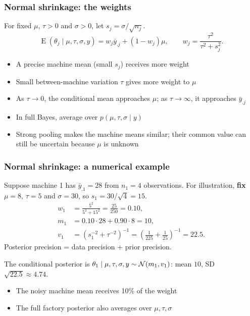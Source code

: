 \documentclass[10pt]{beamer}
\begin{document}
\begin{frame}
\frametitle{Normal shrinkage: the weights}

  For fixed $\mu$, $\tau>0$ and $\sigma>0$, let $s_j=\sigma/\sqrt{n_j}$.
  \[
    \operatorname{E}(\theta_j\mid\mu,\tau,\sigma,y)
      =w_j\bar y_{.j}+(1-w_j)\mu,\qquad
    w_j=\frac{\tau^2}{\tau^2+s_j^2}.
  \]
  \begin{itemize}
  \item A precise machine mean (small $s_j$) receives more weight
  \item Small between-machine variation $\tau$ gives more weight to $\mu$
  \item As $\tau\to0$, the conditional mean approaches $\mu$;
    as $\tau\to\infty$, it approaches $\bar y_{.j}$
  \item In full Bayes, average over $p(\mu,\tau,\sigma\mid y)$
  \item Strong pooling makes the machine means similar;
    their common value can still be uncertain because $\mu$ is unknown
  \end{itemize}
\end{frame}

\begin{frame}
\frametitle{Normal shrinkage: a numerical example}

  Suppose machine 1 has $\bar y_{.1}=28$ from $n_1=4$ observations.
  For illustration, \textbf{fix} $\mu=8$, $\tau=5$ and $\sigma=30$,
  so $s_1=30/\sqrt{4}=15$.
  \begin{align*}
    w_1&=\frac{5^2}{5^2+15^2}=\frac{25}{250}=0.10,\\
    m_1&=0.10\cdot28+0.90\cdot8=10,\\
    v_1&=\left(s_1^{-2}+\tau^{-2}\right)^{-1}
      =\left(\frac{1}{225}+\frac{1}{25}\right)^{-1}=22.5.
  \end{align*}
  Posterior precision = data precision + prior precision.

  The conditional posterior is
  $\theta_1\mid\mu,\tau,\sigma,y\sim\mathcal{N}(m_1,v_1)$:
  mean $10$, SD $\sqrt{22.5}\approx4.74$.
  \begin{itemize}
  \item The noisy machine mean receives 10\% of the weight
  \item The full factory posterior also averages over $\mu,\tau,\sigma$
  \end{itemize}
\end{frame}
\end{document}
